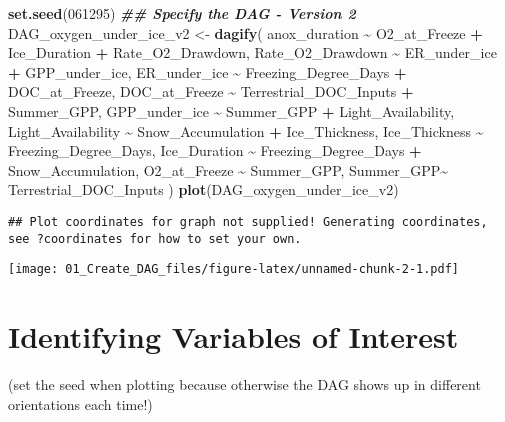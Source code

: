\documentclass[
]{article}
\newenvironment{Shaded}{\begin{snugshade}}{\end{snugshade}}
\newcommand{\DecValTok}[1]{\textcolor[rgb]{0.00,0.00,0.81}{#1}}
\newcommand{\DocumentationTok}[1]{\textcolor[rgb]{0.56,0.35,0.01}{\textbf{\textit{#1}}}}
\newcommand{\FunctionTok}[1]{\textcolor[rgb]{0.13,0.29,0.53}{\textbf{#1}}}
\newcommand{\NormalTok}[1]{#1}
\newcommand{\OtherTok}[1]{\textcolor[rgb]{0.56,0.35,0.01}{#1}}
\newcommand{\SpecialCharTok}[1]{\textcolor[rgb]{0.81,0.36,0.00}{\textbf{#1}}}
\begin{document}
\begin{Shaded}
\begin{Highlighting}[]
\FunctionTok{set.seed}\NormalTok{(}\DecValTok{061295}\NormalTok{)}
\DocumentationTok{\#\# Specify the DAG {-} Version 2}
\NormalTok{DAG\_oxygen\_under\_ice\_v2 }\OtherTok{\textless{}{-}} \FunctionTok{dagify}\NormalTok{(}
\NormalTok{  anox\_duration }\SpecialCharTok{\textasciitilde{}}\NormalTok{ O2\_at\_Freeze }\SpecialCharTok{+}\NormalTok{ Ice\_Duration }\SpecialCharTok{+}\NormalTok{ Rate\_O2\_Drawdown,}
\NormalTok{  Rate\_O2\_Drawdown }\SpecialCharTok{\textasciitilde{}}\NormalTok{ ER\_under\_ice }\SpecialCharTok{+}\NormalTok{ GPP\_under\_ice, }
\NormalTok{  ER\_under\_ice }\SpecialCharTok{\textasciitilde{}}\NormalTok{ Freezing\_Degree\_Days }\SpecialCharTok{+}\NormalTok{ DOC\_at\_Freeze,}
\NormalTok{  DOC\_at\_Freeze }\SpecialCharTok{\textasciitilde{}}\NormalTok{ Terrestrial\_DOC\_Inputs }\SpecialCharTok{+}\NormalTok{ Summer\_GPP, }
\NormalTok{  GPP\_under\_ice }\SpecialCharTok{\textasciitilde{}}\NormalTok{ Summer\_GPP }\SpecialCharTok{+}\NormalTok{ Light\_Availability,}
\NormalTok{  Light\_Availability }\SpecialCharTok{\textasciitilde{}}\NormalTok{ Snow\_Accumulation }\SpecialCharTok{+}\NormalTok{ Ice\_Thickness,}
\NormalTok{  Ice\_Thickness }\SpecialCharTok{\textasciitilde{}}\NormalTok{ Freezing\_Degree\_Days,}
\NormalTok{  Ice\_Duration }\SpecialCharTok{\textasciitilde{}}\NormalTok{ Freezing\_Degree\_Days }\SpecialCharTok{+}\NormalTok{ Snow\_Accumulation, }
\NormalTok{  O2\_at\_Freeze }\SpecialCharTok{\textasciitilde{}}\NormalTok{ Summer\_GPP,}
\NormalTok{  Summer\_GPP}\SpecialCharTok{\textasciitilde{}}\NormalTok{ Terrestrial\_DOC\_Inputs}
\NormalTok{)}
\FunctionTok{plot}\NormalTok{(DAG\_oxygen\_under\_ice\_v2)}
\end{Highlighting}
\end{Shaded}

\begin{verbatim}
## Plot coordinates for graph not supplied! Generating coordinates, see ?coordinates for how to set your own.
\end{verbatim}

\texttt{[image: 01\_Create\_DAG\_files/figure-latex/unnamed-chunk-2-1.pdf]}

\section{Identifying Variables of
Interest}\label{identifying-variables-of-interest}

(set the seed when plotting because otherwise the DAG shows up in
different orientations each time!)
\end{document}
